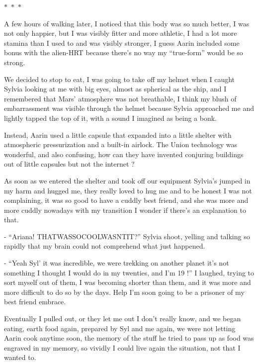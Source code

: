 \documentclass[hidelinks,12pt,a4paper]{book}
\newcommand\sep{\begin{center}
  \boldmath $\ast$~$\ast$~$\ast$
\end{center}}
\begin{document}
\sep

A few hours of walking later, I noticed that this body was so much better, I was not only happier, but I was visibly 
fitter and more athletic, I had a lot more stamina than I used to and was visibly stronger, 
I guess Aarin included some bonus with the alien-HRT because there's no way my “true-form” would be so strong.\par
\bigskip

We decided to stop to eat, I was going to take off my helmet when I caught Sylvia looking at me with big eyes, 
almost as spherical as the ship, and I remembered that Mars' atmosphere was not breathable, 
I think my blush of embarrassment was visible through the helmet because Sylvia approached me and 
lightly tapped the top of it, with a sound I imagined as being a bonk.\par
\bigskip

Instead, Aarin used a little capsule that expanded into a little shelter with atmospheric pressurization 
and a built-in airlock. The Union technology was wonderful, and also confusing, how can they have invented 
conjuring buildings out of little capsules but not the internet ?\par
\bigskip

As soon as we entered the shelter and took off our equipment Sylvia's jumped in my harm and hugged me, 
they really loved to hug me and to be honest I was not complaining, it was so good to have a cuddly best friend, 
and she was more and more cuddly nowadays with my transition I wonder if there's an explanation to that.\par
\bigskip

- “Ariana! THATWASSOCOOLWASNTIT?” Sylvia shoot, yelling and talking so rapidly that my brain 
could not comprehend what just happened.\newline

- “Yeah Syl' it was incredible, we were trekking on another planet it's not something I thought I would do in my twenties, 
and I'm 19 !” I laughed, trying to sort myself out of them, I was becoming shorter than them, and it was more 
and more difficult to do so by the days. Help I'm soon going to be a prisoner of my best friend embrace.\newline

Eventually I pulled out, or they let me out I don't really know, and we began eating, earth food again, 
prepared by Syl and me again, we were not letting Aarin cook anytime soon, the memory of the stuff he tried 
to pass up as food was engraved in my memory, so vividly I could live again the situation, not that I wanted to.\par
\bigskip
\end{document}
